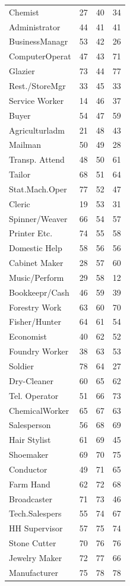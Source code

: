 \begin{tabular}{lccc}
Chemist&27&40&34\\
Administrator&44&41&41\\
BusinessManagr&53&42&26\\
ComputerOperat&47&43&71\\
Glazier&73&44&77\\
Rest./StoreMgr&33&45&33\\
Service Worker&14&46&37\\
Buyer&54&47&59\\
Agriculturladm&21&48&43\\
Mailman&50&49&28\\
Transp. Attend&48&50&61\\
Tailor&68&51&64\\
Stat.Mach.Oper&77&52&47\\
Cleric&19&53&31\\
Spinner/Weaver&66&54&57\\
Printer Etc.&74&55&58\\
Domestic Help&58&56&56\\
Cabinet Maker&28&57&60\\
Music/Perform&29&58&12\\
Bookkeepr/Cash&46&59&39\\
Forestry Work&63&60&70\\
Fisher/Hunter&64&61&54\\
Economist&40&62&52\\
Foundry Worker&38&63&53\\
Soldier&78&64&27\\
Dry-Cleaner&60&65&62\\
Tel. Operator&51&66&73\\
ChemicalWorker&65&67&63\\
Salesperson&56&68&69\\
Hair Stylist&61&69&45\\
Shoemaker&69&70&75\\
Conductor&49&71&65\\
Farm Hand&62&72&68\\
Broadcaster&71&73&46\\
Tech.Salespers&55&74&67\\
HH Supervisor&57&75&74\\
Stone Cutter&70&76&76\\
Jewelry Maker&72&77&66\\
Manufacturer&75&78&78\\
\hline\hline
\end{tabular}
